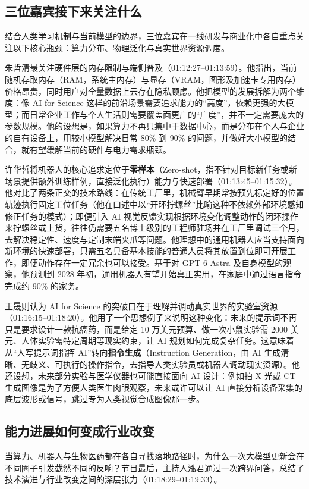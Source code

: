 \documentclass[UTF8,a4paper,11pt,fontset=fandol]{ctexart}
\begin{document}
\subsection{三位嘉宾接下来关注什么}
结合人类学习机制与当前模型的边界，三位嘉宾在一线研发与商业化中各自重点关注以下核心瓶颈：算力分布、物理泛化与真实世界资源调度。

朱哲清最关注硬件层的内存限制与端侧普及（01:12:27–01:13:59）。他指出，当前随机存取内存（RAM，系统主内存）与显存（VRAM，图形及加速卡专用内存）价格昂贵，同时用户对全量数据上云存在隐私顾虑。他把模型的发展拆解为两个维度：像 AI for Science 这样的前沿场景需要追求能力的“高度”，依赖更强的大模型；而日常企业工作与个人生活则需要覆盖面更广的“广度”，并不一定需要庞大的参数规模。他的设想是，如果算力不再只集中于数据中心，而是分布在个人与企业的自有设备上，用较小模型解决日常 80\% 到 90\% 的问题，并做好大小模型的结合，就有望缓解当前的硬件与电力需求瓶颈。

许华哲将机器人的核心追求定位于\textbf{零样本}（Zero-shot，指不针对目标新任务或新场景提供额外训练样例，直接泛化执行）能力与快速部署（01:13:45–01:15:32）。他对比了两条正交的技术路线：在传统工厂里，机械臂早期常按预先标定好的位置轨迹执行固定工位任务（他在口述中以“开环拧螺丝”比喻这种不依赖外部环境感知修正任务的模式）；即便引入 AI 视觉反馈实现根据环境变化调整动作的闭环操作来拧螺丝或上货，往往仍需要五名博士级别的工程师驻场并在工厂里调试三个月，去解决稳定性、速度与定制末端夹爪等问题。他理想中的通用机器人应当支持面向新环境的快速部署，只需五名具备基本技能的普通人员将其放置到位即可开展工作，即便动作存在一定冗余也可以接受。基于对 GPT-6 Astra 及自身模型的观察，他预测到 2028 年初，通用机器人有望开始真正实用，在家庭中通过语言指令完成约 90\% 的家务。

王晟则认为 AI for Science 的突破口在于理解并调动真实世界的实验室资源（01:16:15–01:18:20）。他用了一个思想例子来说明这种变化：未来的提示词不再只是要求设计一款抗癌药，而是给定 10 万美元预算、做一次小鼠实验需 2000 美元、人体实验需特定周期等现实约束，让 AI 规划如何完成复杂任务。这意味着从“人写提示词指挥 AI”转向\textbf{指令生成}（Instruction Generation，由 AI 生成清晰、无歧义、可执行的操作指令，去指导人类实验员或机器人调动现实资源）。他还设想，未来部分实验与医学仪器也可能直接面向 AI 设计：例如拍 X 光或 CT 生成图像是为了方便人类医生肉眼观察，未来或许可以让 AI 直接分析设备采集的底层波形或信号，跳过专为人类视觉合成图像那一步。

\subsection{能力进展如何变成行业改变}
当算力、机器人与生物医药都在各自寻找落地路径时，为什么一次大模型更新会在不同圈子引发截然不同的反响？节目最后，主持人泓君通过一次跨界问答，总结了技术演进与行业改变之间的深层张力（01:18:29–01:19:33）。
\end{document}
